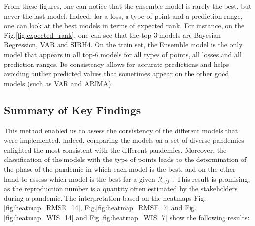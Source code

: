 From these figures, one can notice that the ensemble model is rarely the best, but never the last model. 
Indeed, for a loss, a type of point and a prediction range, one can look at the best models in terms of expected rank.
For instance, on the Fig.\ref{fig:expected_rank}, one can see that the top 3 models are Bayesian Regression, VAR and SIRH4. 
On the train set, the Ensemble model is the only model that appears in all top-6 models for all types of points, all losses and all prediction ranges.
Its consistency allows for accurate predictions and helps avoiding outlier predicted values that sometimes appear on the other good models (such as VAR and ARIMA). 



\subsection{Summary of Key Findings}

This method enabled us to assess the consistency of the different models that were implemented. 
Indeed, comparing the models on a set of diverse pandemics enlighted the most consistent with the different pandemics.
Moreover, the classification of the models with the type of points leads to the determination of the phase of the pandemic in which each model is the best, and on the other hand to assess which model is the best for a given $R_{eff}$ . 
This result is promising, as the reproduction number is a quantity often estimated by the stakeholders during a pandemic. 
The interpretation based on the heatmaps Fig.\ref{fig:heatmap_RMSE_14}, Fig.\ref{fig:heatmap_RMSE_7} and Fig.\ref{fig:heatmap_WIS_14} and Fig.\ref{fig:heatmap_WIS_7} show the following results: \\



